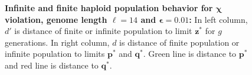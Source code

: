 \begin{figure}[ht]
\begin{center}
\hspace{-3em}%
\vspace{-0.5em} \hspace{-3em}%

\caption[\textbf{Infinite and finite haploid population behavior for $\bm{\chi}$ violation, genome length $\ell = 14$ and $\bm{\epsilon} = 0.01$}]{\textbf{Infinite and finite haploid population behavior for $\bm{\chi}$ violation, genome length $\ell = 14$ and $\bm{\epsilon} = 0.01$:} 
  In left column, $d'$ is distance of finite or infinite population to limit $\bm{z}^\ast$ for $g$ generations. In right column, $d$ is distance of finite population or infinite population to limits $\bm{p}^\ast$ and $\bm{q}^\ast$. Green line is distance to $\bm{p}^\ast$ and red line is distance to $\bm{q}^\ast$.}
\label{oscillation_14h_vio_chi_0.01}
\end{center}
\end{figure}

